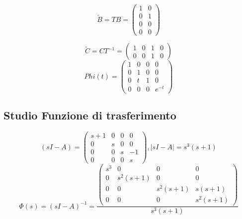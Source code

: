 \documentclass{article}
\begin{document}
\[ \widetilde{B} = T B = \left(\begin{matrix}1 & 0\\0 & 1\\0 & 0\\0 & 0\end{matrix}\right) \]

\[ \widetilde{C} = C T^{-1} = \left(\begin{matrix}1 & 0 & 1 & 0\\0 & 0 & 1 & 0\end{matrix}\right) \]
\[Phi(t) = \left(\begin{matrix}1 & 0 & 0 & 0\\0 & 1 & 0 & 0\\0 & t & 1 & 0\\0 & 0 & 0 & e^{- t}\end{matrix}\right) \]

\subsection{Studio Funzione di trasferimento}

\[ (sI-A) = \left(\begin{matrix}s + 1 & 0 & 0 & 0\\0 & s & 0 & 0\\0 & 0 & s & -1\\0 & 0 & 0 & s\end{matrix}\right), |sI-A| = s^{3} \left(s + 1\right) \]
\[ \Phi(s) = (sI-A)^{-1} = \frac{\left(\begin{matrix}s^{3} & 0 & 0 & 0\\0 & s^{2} \left(s + 1\right) & 0 & 0\\0 & 0 & s^{2} \left(s + 1\right) & s \left(s + 1\right)\\0 & 0 & 0 & s^{2} \left(s + 1\right)\end{matrix}\right)}{s^{3} \left(s + 1\right)} \]
\end{document}
